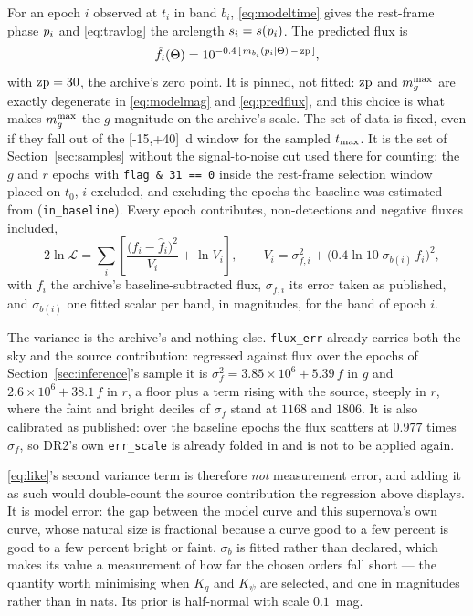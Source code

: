 \documentclass[11pt]{article}
\theoremstyle{plain}
\begin{document}
For an epoch $i$ observed at $t_{i}$ in band $b_{i}$, \eqref{eq:modeltime} gives the
rest-frame phase $p_{i}$ and \eqref{eq:travlog} the arclength
$s_{i} = s(p_{i})$.
The predicted flux is
\begin{equation}
  \hat f_{i}(\Theta)
    = 10^{-0.4\,[\,m_{b_{i}}(p_{i} \mid \Theta)\, -\, \mathrm{zp}\,]} ,
  \label{eq:predflux}
\end{equation}
with $\mathrm{zp} = 30$, the archive's zero point. It is pinned, not fitted: $\mathrm{zp}$ and $m_{g}^{\max}$
are exactly degenerate in \eqref{eq:modelmag} and \eqref{eq:predflux}, and this choice is
what makes $m_{g}^{\max}$ the $g$ magnitude on the archive's scale.
The set of data is fixed, even if they fall out of the [-15,+40]~d window for the
sampled $t_{\mathrm{max}}$. It is the set of Section~\ref{sec:samples} without the signal-to-noise
cut used there for counting: the $g$ and $r$ epochs with \texttt{flag \& 31 == 0} inside
the rest-frame selection window placed on $t_{0}$, $i$ excluded, and excluding the epochs
the baseline was estimated from (\texttt{in\_baseline}). Every epoch contributes,
non-detections and negative fluxes included,
\begin{equation}
  -2\ln\mathcal{L}
    = \sum_{i}\left[\frac{\bigl(f_{i} - \hat f_{i}\bigr)^{2}}{V_{i}} + \ln V_{i}\right] ,
  \qquad
  V_{i} = \sigma_{f,i}^{2} + \bigl(0.4\ln 10\;\sigma_{b(i)}\,f_{i}\bigr)^{2} ,
  \label{eq:like}
\end{equation}
with $f_{i}$ the archive's baseline-subtracted flux, $\sigma_{f,i}$ its error taken as
published, and $\sigma_{b(i)}$ one fitted scalar per band, in magnitudes, for the band of
epoch $i$.

The variance is the archive's and nothing else. \texttt{flux\_err} already carries both the
sky and the source contribution: regressed against flux over the epochs of
Section~\ref{sec:inference}'s sample it is
$\sigma_{f}^{2} = 3.85\times10^{6} + 5.39\,f$ in $g$ and
$2.6\times10^{6} + 38.1\,f$ in $r$, a floor plus a term rising with the source, steeply in
$r$, where the faint and bright deciles of $\sigma_{f}$ stand at $1168$ and $1806$. It is
also calibrated as published: over the baseline epochs the flux scatters at $0.977$ times
$\sigma_{f}$, so DR2's own \texttt{err\_scale} is already folded in and is not to be
applied again.

\eqref{eq:like}'s second variance term is therefore \emph{not} measurement error, and
adding it as such would double-count the source contribution the regression above
displays. It is model error: the gap between the model curve and this supernova's own
curve, whose natural size is fractional because a curve good to a few percent is good to a
few percent bright or faint. $\sigma_{b}$ is fitted rather than declared, which makes its
value a measurement of how far the chosen orders fall short --- the quantity worth
minimising when $K_{q}$ and $K_{\psi}$ are selected, and one in magnitudes rather than in nats.
Its prior is half-normal with scale $0.1$~mag.
\end{document}
